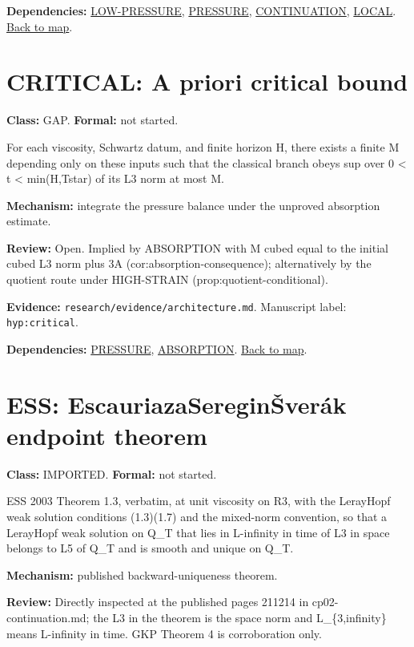 \documentclass[10pt]{article}
\begin{document}
\textbf{Dependencies:} \hyperref[node:LOW-PRESSURE]{LOW-PRESSURE}, \hyperref[node:PRESSURE]{PRESSURE}, \hyperref[node:CONTINUATION]{CONTINUATION}, \hyperref[node:LOCAL]{LOCAL}. \hyperref[map]{Back to map}.

\section*{CRITICAL: A priori critical bound}\label{node:CRITICAL}
\textbf{Class:} GAP. \textbf{Formal:} not started.

For each viscosity, Schwartz datum, and finite horizon H, there exists a finite M depending only on these inputs such that the classical branch obeys sup over 0 < t < min(H,Tstar) of its L3 norm at most M.

\textbf{Mechanism:} integrate the pressure balance under the unproved absorption estimate.

\textbf{Review:} Open. Implied by ABSORPTION with M cubed equal to the initial cubed L3 norm plus 3A (cor:absorption-consequence); alternatively by the quotient route under HIGH-STRAIN (prop:quotient-conditional).

\textbf{Evidence:} \texttt{research/evidence/architecture.md}. Manuscript label: \texttt{hyp:critical}.

\textbf{Dependencies:} \hyperref[node:PRESSURE]{PRESSURE}, \hyperref[node:ABSORPTION]{ABSORPTION}. \hyperref[map]{Back to map}.

\section*{ESS: Escauriaza\textendash{}\allowbreak{}Seregin\textendash{}\allowbreak{}Šverák endpoint theorem}\label{node:ESS}
\textbf{Class:} IMPORTED. \textbf{Formal:} not started.

ESS 2003 Theorem 1.3, verbatim, at unit viscosity on R3, with the Leray\textendash{}\allowbreak{}Hopf weak solution conditions (1.3)\textendash{}\allowbreak{}(1.7) and the mixed-norm convention, so that a Leray\textendash{}\allowbreak{}Hopf weak solution on Q\_T that lies in L-infinity in time of L3 in space belongs to L5 of Q\_T and is smooth and unique on Q\_T.

\textbf{Mechanism:} published backward-uniqueness theorem.

\textbf{Review:} Directly inspected at the published pages 211\textendash{}\allowbreak{}214 in cp02-continuation.md; the L3 in the theorem is the space norm and L\_\{3,infinity\} means L-infinity in time. GKP Theorem 4 is corroboration only.
\end{document}
